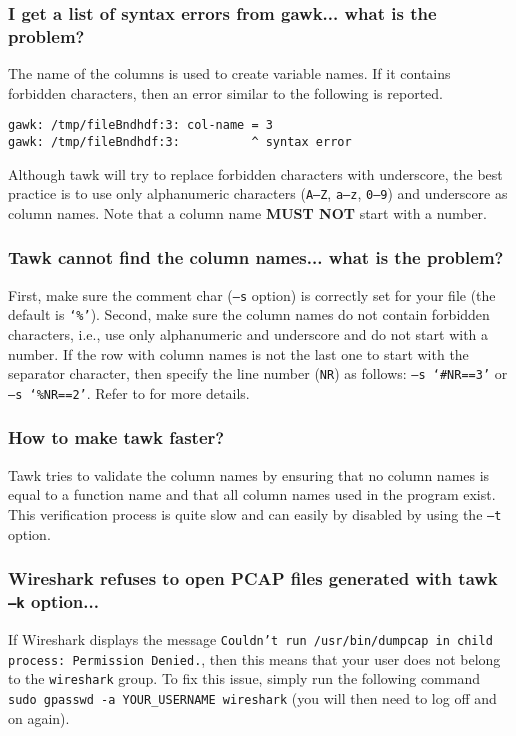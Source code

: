 \documentclass[documentation]{subfiles}
\begin{document}
\subsubsection{I get a list of syntax errors from gawk... what is the problem?}
The name of the columns is used to create variable names.
If it contains forbidden characters, then an error similar to the following is reported.
\begin{verbatim}
gawk: /tmp/fileBndhdf:3: col-name = 3
gawk: /tmp/fileBndhdf:3:          ^ syntax error
\end{verbatim}
Although tawk will try to replace forbidden characters with underscore, the best practice is to use only alphanumeric characters ({\tt A--Z}, {\tt a--z}, {\tt 0--9}) and underscore as column names.
Note that a column name {\bf MUST NOT} start with a number.

\subsubsection{Tawk cannot find the column names... what is the problem?}
First, make sure the comment char ({\tt --s} option) is correctly set for your file (the default is {\tt `\%'}).
Second, make sure the column names do not contain forbidden characters, i.e., use only alphanumeric and underscore and do not start with a number.
If the row with column names is not the last one to start with the separator character, then specify the line number ({\tt NR}) as follows: {\tt --s `\#NR==3'} or {\tt --s `\%NR==2'}.
Refer to  for more details.

\subsubsection{How to make tawk faster?}
Tawk tries to validate the column names by ensuring that no column names is equal to a function name and that all column names used in the program exist. This verification process is quite slow and can easily by disabled by using the {\tt --t} option.

\subsubsection{Wireshark refuses to open PCAP files generated with tawk {\tt--k} option...}
If Wireshark displays the message {\tt Couldn't run /usr/bin/dumpcap in child process: Permission Denied.}, then this means that your user does not belong to the {\tt wireshark} group.
To fix this issue, simply run the following command {\tt sudo gpasswd -a YOUR\_USERNAME wireshark} (you will then need to log off and on again).
\end{document}
